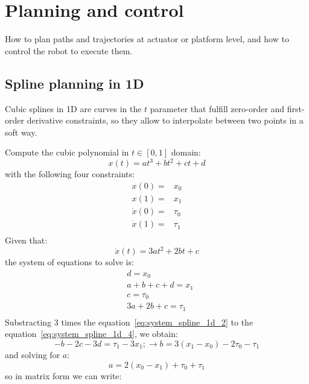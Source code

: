 \section{Planning and control}
How to plan paths and trajectories at actuator or platform level, and how to control the robot to execute them. 

\subsection{Spline planning in 1D}
Cubic splines in 1D are curves in the $t$ parameter that fulfill zero-order and first-order derivative constraints, so they allow to interpolate between two points in a soft way.

Compute the cubic polynomial in $t\in[0,1]$ domain:
\begin{equation}
 x(t) = at^3 + bt^2 + ct + d
\end{equation}
with the following four constraints: 
\begin{align}
 x(0) = & x_0 \\
 x(1) = & x_1 \\
 \dot{x}(0) = & \tau_0 \\
 \dot{x}(1) = & \tau_1 \\
\end{align}
Given that: 
\begin{equation}
 \dot{x}(t) = 3at^2 + 2bt + c
\end{equation}
the system of equations to solve is: 
\begin{align}
 & d = x_0 \\ \label{eq:system_spline_1d_1}
 & a+b+c+d = x_1 \\ \label{eq:system_spline_1d_2}
 & c = \tau_0 \\ \label{eq:system_spline_1d_3}
 & 3a+2b+c = \tau_1 \\ \label{eq:system_spline_1d_4}
\end{align}
Substracting 3 times the equation~\ref{eq:system_spline_1d_2} to the equation~\ref{eq:system_spline_1d_4}, we obtain: 
\begin{equation}
 -b -2c -3d = \tau_1-3x_1; \rightarrow b=3(x_1-x_0) - 2\tau_0 - \tau_1
\end{equation}
and solving for $a$: 
\begin{equation}
 a=2(x_0-x_1) + \tau_0 + \tau_1
\end{equation}
so in matrix form we can write: 
